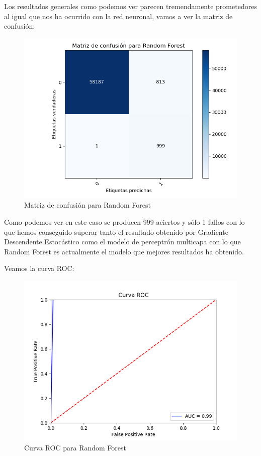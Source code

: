 Los resultados generales como podemos ver parecen tremendamente prometedores al igual que nos ha ocurrido con la red neuronal, vamos a ver la matriz de confusión:

\begin{figure}[H] %
	\centering
	\includegraphics[scale=0.6]{RandomForestConf.png}  %
	\caption{Matriz de confusión para Random Forest} 
	\label{fig:conf-rf}
\end{figure}

Como podemos ver en este caso se producen 999 aciertos y sólo 1 fallos con lo que hemos conseguido superar tanto el resultado obtenido por Gradiente Descendente Estocástico como el modelo de perceptrón multicapa con lo que Random Forest es actualmente el modelo que mejores resultados ha obtenido.

Veamos la curva ROC:

\begin{figure}[H] %
	\centering
	\includegraphics[scale=0.6]{ROC-RF.png}  %
	\caption{Curva ROC para Random Forest} 
	\label{fig:roc-rf}
\end{figure}

